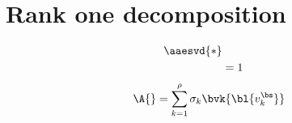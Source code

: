 \section{Rank one decomposition}
\begin{equation}
  \begin{split}
    \aaesvd{*} \\
      &= 1
  \end{split}
\end{equation}
%
\begin{equation}
   \A{} = \sum_{k=1}^{\rho} \sigma_{k} \bvk {\bl{ v_{k}^{\bs} }} \\
\end{equation}

\clearpage
\thispagestyle{empty}
\begin{landscape}

\end{landscape}


\endinput